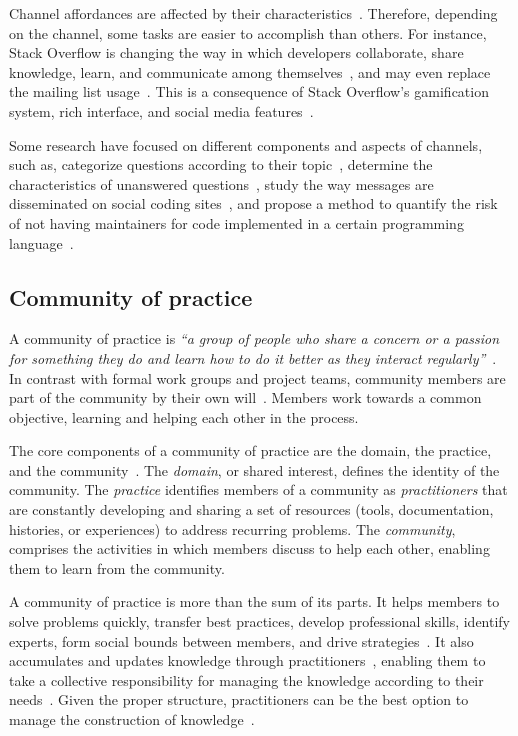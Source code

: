\documentclass{sig-alternate-05-2015}
\begin{document}
    Channel affordances are affected by their characteristics~\cite{Storey2014}.
	Therefore, depending on the channel, some tasks are easier to accomplish than others.
	For instance, Stack Overflow is changing the way in which developers collaborate, share knowledge, learn, and communicate among themselves~\cite{Storey2014}, and may even replace the mailing list usage~\cite{Vasilescu2014b}.
	This is a consequence of Stack Overflow's gamification system, rich interface, and social media features~\cite{Vasilescu2014b}.

	Some research have focused on different components and aspects of channels, such as,
categorize questions according to their topic~\cite{Treude2011}, determine the characteristics of unanswered questions~\cite{Asaduzzaman2013}, study the way messages are disseminated on social coding sites~\cite{Jiang2013}, and propose a method to quantify the risk of not having maintainers for code implemented in a certain programming language~\cite{Vasilescu2013b}.

\subsection{Community of practice}
	A community of practice is \textit{``a group of people who share a concern or a passion for something they do and learn how to do it better as they interact regularly''}~\cite{Wenger2000}.
	In contrast with formal work groups and project teams, community members are part of the community by their own will~\cite{Wenger2000}.
	Members work towards a common objective, learning and helping each other in the process.

	The core components of a community of practice are the domain, the practice, and the community~\cite{Wenger2011}.
	The \textit{domain}, or shared interest, defines the identity of the community.
	The \textit{practice} identifies members of a community as \textit{practitioners} that are constantly developing and sharing a set of resources (tools, documentation, histories, or experiences) to address recurring problems. 
	The \textit{community}, comprises the activities in which members discuss to help each other, enabling them to learn from the community.

	A community of practice is more than the sum of its parts.
	It helps members to solve problems quickly, transfer best practices, develop professional skills, identify experts, form social bounds between members, and drive strategies~\cite{Wenger2011, Storey2014}.
	It also accumulates and updates knowledge through practitioners~\cite{Wenger2010}, enabling them to take a collective responsibility for managing the knowledge according to their needs~\cite{Wenger2011}.
	Given the proper structure, practitioners can be the best option to manage the construction of knowledge~\cite{Wenger2011}.
\end{document}
